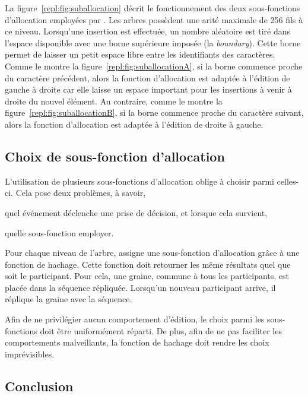 La figure~\ref{repl:fig:suballocation} décrit le fonctionnement des deux
sous-fonctions d'allocation employées par \LSEQ. Les arbres possèdent une arité
maximale de 256 fils à ce niveau. Lorsqu'une insertion est effectuée, un nombre
aléatoire est tiré dans l'espace disponible avec une borne supérieure imposée
(la \emph{boundary}). Cette borne permet de laisser un petit espace libre entre
les identifiants des caractères.%
Comme le montre la figure~\ref{repl:fig:suballocationA}, si la borne commence
proche du caractère précédent, alors la fonction d'allocation est adaptée à
l'édition de gauche à droite car elle laisse un espace important pour les
insertions à venir à droite du nouvel élément. Au contraire, comme le montre la
figure~\ref{repl:fig:suballocationB}, si la borne commence proche du caractère
suivant, alors la fonction d'allocation est adaptée à l'édition de droite à
gauche.

\subsection{Choix de sous-fonction d'allocation}
\label{repl:subsec:allocationchoice}

L'utilisation de plusieurs sous-fonctions d'allocation oblige à choisir parmi
celles-ci. Cela pose deux problèmes, à savoir,
\begin{inparaenum}[(i)]
\item quel événement déclenche une prise de décision, et lorsque cela survient, 
\item quelle sous-fonction employer.
\end{inparaenum}

Pour chaque niveau de l'arbre, \LSEQ assigne une sous-fonction d'allocation
grâce à une fonction de hachage. Cette fonction doit retourner les même
résultats quel que soit le participant. Pour cela, une graine, commune à tous
les participants, est placée dans la séquence répliquée. Lorsqu'un nouveau
participant arrive, il réplique la graine avec la séquence.

Afin de ne privilégier aucun comportement d'édition, le choix parmi les
sous-fonctions doit être uniformément réparti. De plus, afin de ne pas faciliter
les comportements malveillants, la fonction de hachage doit rendre les choix
imprévisibles.

\subsection{Conclusion}

